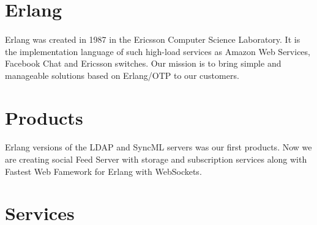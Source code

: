 \documentclass[11pt]{article}
\begin{document}
\paragraph{}
\paragraph{}

\section*{Erlang}
\paragraph{}
Erlang was created in 1987 in the Ericsson Computer Science Laboratory.
It is the implementation language of such high-load services as Amazon Web Services,
Facebook Chat and Ericsson switches.
Our mission is to bring simple and manageable solutions based on Erlang/OTP to our customers.

\section*{Products}
\paragraph{}
Erlang versions of the LDAP and SyncML servers was our first products. Now we are
creating social Feed Server with storage and subscription services along with
Fastest Web Famework for Erlang with WebSockets.

\section*{Services}
\end{document}
